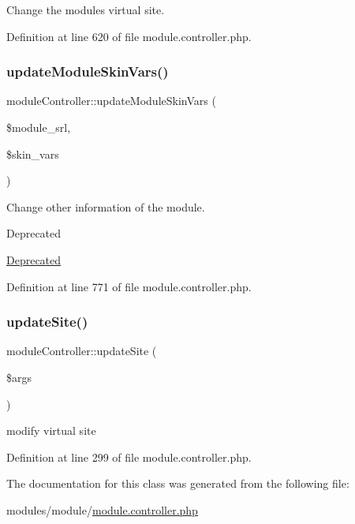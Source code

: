 Change the module\textquotesingle{}s virtual site. 



Definition at line 620 of file module.\+controller.\+php.

\mbox{\label{classmoduleController_aa877238508d8cde2ad00f40b8ff283c0}} 
\subsubsection{\texorpdfstring{update\+Module\+Skin\+Vars()}{updateModuleSkinVars()}}
{\footnotesize\ttfamily module\+Controller\+::update\+Module\+Skin\+Vars (\begin{DoxyParamCaption}\item[{}]{\$module\+\_\+srl,  }\item[{}]{\$skin\+\_\+vars }\end{DoxyParamCaption})}



Change other information of the module. 

\begin{DoxyRefDesc}{Deprecated}
\item[\hyperlink{deprecated__deprecated000026}{Deprecated}]\end{DoxyRefDesc}


Definition at line 771 of file module.\+controller.\+php.

\mbox{\label{classmoduleController_ae2fb61c8a558f0552202c51d2055eede}} 
\subsubsection{\texorpdfstring{update\+Site()}{updateSite()}}
{\footnotesize\ttfamily module\+Controller\+::update\+Site (\begin{DoxyParamCaption}\item[{}]{\$args }\end{DoxyParamCaption})}



modify virtual site 



Definition at line 299 of file module.\+controller.\+php.



The documentation for this class was generated from the following file\+:\begin{DoxyCompactItemize}
\item 
modules/module/\hyperlink{module_8controller_8php}{module.\+controller.\+php}\end{DoxyCompactItemize}
